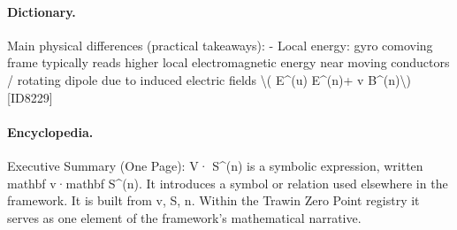\paragraph{Dictionary.}
Main physical differences (practical takeaways): - Local energy: gyro comoving frame typically reads higher local electromagnetic energy near moving conductors / rotating dipole due to induced electric fields \textbackslash{}( E\textasciicircum{}(u) E\textasciicircum{}(n)+ v B\textasciicircum{}(n)\textbackslash{}) [ID8229]

\paragraph{Encyclopedia.}
Executive Summary (One Page): V· S\textasciicircum{}(n) is a symbolic expression, written mathbf v·mathbf S\textasciicircum{}(n). It introduces a symbol or relation used elsewhere in the framework. It is built from v, S, n. Within the Trawin Zero Point registry it serves as one element of the framework's mathematical narrative.
